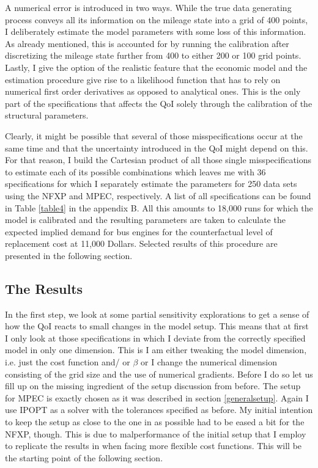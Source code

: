 A numerical error is introduced in two ways. While the true data generating process conveys all its information on the mileage state into a grid of 400 points, I deliberately estimate the model parameters with some loss of this information. As already mentioned, this is accounted for by running the calibration after discretizing the mileage state further from 400 to either 200 or 100 grid points. Lastly, I give the option of the realistic feature that the economic model and the estimation procedure give rise to a likelihood function that has to rely on numerical first order derivatives as opposed to analytical ones. This is the only part of the specifications that affects the QoI solely through the calibration of the structural parameters.

Clearly, it might be possible that several of those misspecifications occur at the same time and that the uncertainty introduced in the QoI might depend on this. For that reason, I build the Cartesian product of all those single misspecifications to estimate each of its possible combinations which leaves me with 36 specifications for which I separately estimate the parameters for 250 data sets using the NFXP and MPEC, respectively. A list of all specifications can be found in Table \ref{table4} in the appendix B. All this amounts to 18,000 runs for which the model is calibrated and the resulting parameters are taken to calculate the expected implied demand for bus engines for the counterfactual level of replacement cost at 11,000 Dollars. Selected results of this procedure are presented in the following section.

\subsection{The Results}

In the first step, we look at some partial sensitivity explorations to get a sense of how the QoI reacts to small changes in the model setup. This means that at first I only look at those specifications in which I deviate from the correctly specified model in only one dimension. This is I am either tweaking the model dimension, i.e. just the cost function and/ or $\beta$ or I change the numerical dimension consisting of the grid size and the use of numerical gradients. Before I do so let us fill up on the missing ingredient of the setup discussion from before. The setup for MPEC is exactly chosen as it was described in section \ref{generalsetup}. Again I use IPOPT as a solver with the tolerances specified as before. My initial intention to keep the setup as close to the one in \cite{Iskhakov.2016} as possible had to be eased a bit for the NFXP, though. This is due to malperformance of the initial setup that I employ to replicate the results in \cite{Iskhakov.2016} when facing more flexible cost functions. This will be the starting point of the following section.


